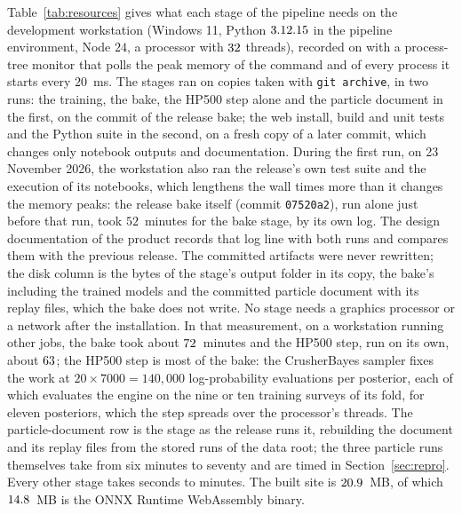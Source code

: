 Table~\ref{tab:resources} gives what each stage of the pipeline needs on the development workstation (Windows 11, Python
$3.12.15$ in the pipeline environment, Node $24$, a processor with $32$ threads), recorded on \resDate{} with a
process-tree monitor that polls the peak memory of the command and of every process it starts every $20$~ms. The stages ran on
copies taken with \texttt{git archive}, in two runs: the training, the bake, the HP500 step alone and the particle document in the
first, on the commit of the release bake; the web install, build and unit tests and the Python suite in the second, on a fresh copy
of a later commit, which changes only notebook outputs and documentation. During the first run, on 23 November 2026, the workstation also ran the
release's own test suite and the execution of its notebooks, which lengthens the wall times more than it changes the memory peaks:
the release bake itself (commit \texttt{07520a2}), run alone just before that run, took $52$~minutes for the bake stage, by its own
log. The design documentation of the product records that log line with both runs and compares them with the previous release. The committed artifacts were never rewritten; the disk column is the bytes of the stage's output folder in its copy, the bake's including the
trained models and the committed particle document with its replay files, which the bake does not write. No stage needs a
graphics processor or a network after the installation. In that measurement, on a workstation running other jobs, the bake took about $72$~minutes and the HP500 step, run on its
own, about $63$; the HP500 step is most of the bake: the CrusherBayes sampler fixes the work at $20\times7000=140{,}000$ log-probability evaluations per posterior, each of which
evaluates the engine on the nine or ten training surveys of its fold, for eleven posteriors, which the step spreads over the processor's
threads. The particle-document row is the stage as the release runs it, rebuilding the document and its replay files from the stored runs of the data root; the three particle runs themselves take from six minutes to seventy and are timed in Section~\ref{sec:repro}. Every other stage takes seconds to minutes. The built site is $20.9$~MB, of which $14.8$~MB is the ONNX Runtime WebAssembly binary.

\begin{table}[!t]
\centering
\caption{Measured resources of each stage of the pipeline and the web on the development workstation, recorded on \resDate: peak
memory of the process tree, disk written and wall time. Generated from \texttt{data/\allowbreak{}resources.json} of the report, which records
each measurement with its exit status.}
\label{tab:resources}
\footnotesize

\end{table}
